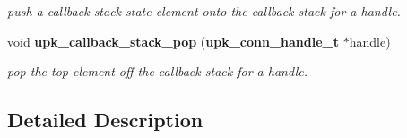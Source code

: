 \begin{DoxyCompactItemize}
\begin{DoxyCompactList}\small\item\em push a callback-\/stack state element onto the callback stack for a handle. \end{DoxyCompactList}\item 
void {\bf upk\_\-callback\_\-stack\_\-pop} ({\bf upk\_\-conn\_\-handle\_\-t} $\ast$handle)
\begin{DoxyCompactList}\small\item\em pop the top element off the callback-\/stack for a handle. \end{DoxyCompactList}\end{DoxyCompactItemize}


\subsection{Detailed Description}
